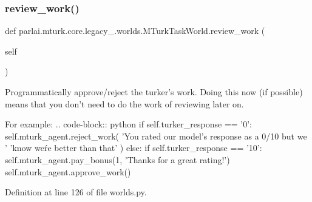 \subsubsection{\texorpdfstring{review\+\_\+work()}{review\_work()}}
{\footnotesize\ttfamily def parlai.\+mturk.\+core.\+legacy\+\_.\+worlds.\+M\+Turk\+Task\+World.\+review\+\_\+work (\begin{DoxyParamCaption}\item[{}]{self }\end{DoxyParamCaption})}

\begin{DoxyVerb}Programmatically approve/reject the turker's work. Doing this now (if possible)
means that you don't need to do the work of reviewing later on.

For example:
.. code-block:: python
    if self.turker_response == '0':
self.mturk_agent.reject_work(
    'You rated our model's response as a 0/10 but we '
    'know we\'re better than that'
)
    else:
if self.turker_response == '10':
    self.mturk_agent.pay_bonus(1, 'Thanks for a great rating!')
self.mturk_agent.approve_work()
\end{DoxyVerb}
 

Definition at line 126 of file worlds.\+py.


